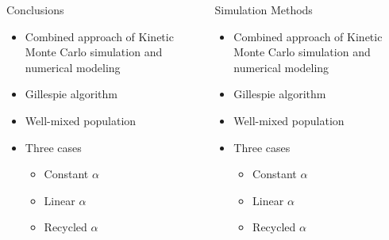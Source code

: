 \documentclass[final]{beamer}
\newlength{\sepwid}
\newlength{\onecolwid}
\begin{document}
\begin{frame}[t]
\begin{block}

\begin{columns}[t] %
\begin{column}{\sepwid}\end{column} %

\begin{column}{\onecolwid}
  \begin{block}{Conclusions}
    \begin{itemize}
      \item Combined approach of Kinetic Monte Carlo simulation and numerical modeling
      \item Gillespie algorithm
      \item Well-mixed population
      \item Three cases
      \begin{itemize}
        \item Constant $\alpha$
        \item Linear $\alpha$
        \item Recycled $\alpha$
      \end{itemize}
    \end{itemize}
  \end{block}
\end{column}

\begin{column}{\sepwid}\end{column} %

\begin{column}{\onecolwid}
  \begin{block}{Simulation Methods}
    \begin{itemize}
      \item Combined approach of Kinetic Monte Carlo simulation and numerical modeling
      \item Gillespie algorithm
      \item Well-mixed population
      \item Three cases
      \begin{itemize}
        \item Constant $\alpha$
        \item Linear $\alpha$
        \item Recycled $\alpha$
      \end{itemize}
    \end{itemize}
  \end{block}
\end{column}


\end{columns}
\end{block}
\end{frame}
\end{document}
